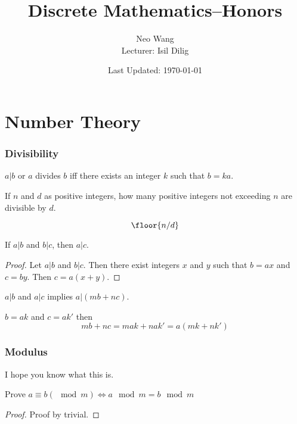 \documentclass{scrreprt}
\title{Discrete Mathematics--Honors}
\author{Neo Wang\\ Lecturer: Isil Dilig}
\date{Last Updated: \today}
\begin{document}
\maketitle
\tableofcontents



\chapter{Number Theory}

\subsection{Divisibility}

\begin{definition}
	$a|b$ or $a$ divides $b$ iff there exists an integer $k$ such that $b=ka$.
\end{definition}

\begin{example}
	If $n$ and $d$ as positive integers, how many positive integers not exceeding $n$ are divisible by $d$.

	\[
		\floor{n/d}
	\]
\end{example}

\begin{example}
	If $a|b$ and $b|c$, then $a|c$.

	\begin{proof}
		Let $a|b$ and $b|c$. Then there exist integers $x$ and $y$ such that $b = ax$ and $c = by$. Then $c = a(x+y)$.
	\end{proof}
\end{example}

\begin{example}
	$a|b$ and $a|c$ implies $a|(mb + nc)$.

	$b=ak$ and $c=ak'$ then \[
		mb+nc=mak+nak'=a(mk+nk')
	\]
\end{example}

\subsection{Modulus}

I hope you know what this is.

\begin{example}
	Prove $a\equiv b (\mod m)\iff a\mod m = b \mod m$

	\begin{proof}
		Proof by trivial.
	\end{proof}
\end{example}
\end{document}
